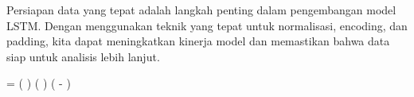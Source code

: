 \par Persiapan data yang tepat adalah langkah penting dalam pengembangan model LSTM. Dengan menggunakan teknik yang tepat untuk normalisasi, encoding, dan padding, kita dapat meningkatkan kinerja model dan memastikan bahwa data siap untuk analisis lebih lanjut.


 = \left(  \right) \cdot \left(  \right) \cdot \exp \left( - \right)

